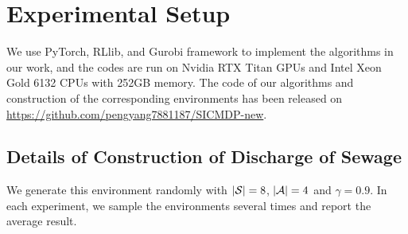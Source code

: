 \section{Experimental Setup}
\label{Appendix_Detials_of_Experiments}
We use PyTorch, RLlib, and Gurobi framework to implement the algorithms in our work, and the codes are run on Nvidia RTX Titan GPUs and Intel Xeon Gold 6132 CPUs with 252GB memory. The code of our algorithms and construction of the corresponding environments has been released on
\href{https://github.com/pengyang7881187/SICMDP-new}{https://github.com/pengyang7881187/SICMDP-new}.




\subsection{Details of Construction of Discharge of Sewage}
We generate this environment randomly with $|{\mathcal{S}}|=8$, $|{\mathcal{A}}|=4$ and $\gamma=0.9$. In each experiment, we sample the environments several times and report the average result.


